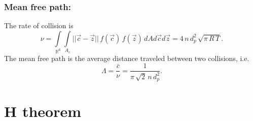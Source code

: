 \subsubsection{Mean free path:}

The rate of collision is
\begin{equation}
  \nu =  \int \limits_{\mathbb{R}^6} \int \limits_{A_c} ||\vec c - \vec z|| \, f(\vec c) \, f(\vec z) \, dA d\vec c d\vec z = 4 \, n \,d_p^2 \, \sqrt{\pi \, R \, T}.\nonumber
\end{equation}
The mean free path is the average distance traveled between two collisions, i.e.
\begin{equation}
  \Lambda = \frac{\bar c}{\nu} = \frac{1}{\pi \, \sqrt{2} \, n \, d_p^2}.\nonumber
\end{equation}

\section{H theorem}

